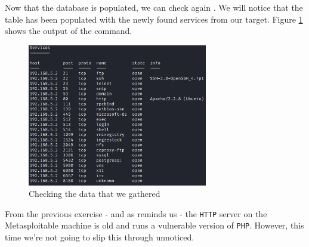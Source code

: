 Now that the database is populated, we can check again . We will notice that the table has been populated with the newly found services from our target. Figure \ref{fig:ex2:services_full_cropped} shows the output of the command.

\begin{figure}[htbp]
    \centering
    \includegraphics[width=0.7\textwidth]{../drawable/exercise_2_screenshots/services_full_v2.png}
    \caption{Checking the data that we gathered}
    \label{fig:ex2:services_full_cropped}
\end{figure}

From the previous exercise - and as  reminds us - the \texttt{HTTP} server on the Metasploitable machine is old and runs a vulnerable version of \texttt{PHP}. However, this time we're not going to slip this through unnoticed.





